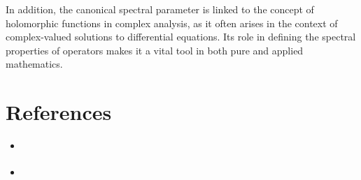 \documentclass[11pt,a4paper]{article}
\begin{document}
In addition, the canonical spectral parameter is linked to the concept of holomorphic functions in complex analysis, as it often arises in the context of complex-valued solutions to differential equations. Its role in defining the spectral properties of operators makes it a vital tool in both pure and applied mathematics.

\section{References}
\begin{itemize}
    \item \cite{2601.19274v4}
    \item \cite{2602.15479v1}
\end{itemize}
\end{document}
